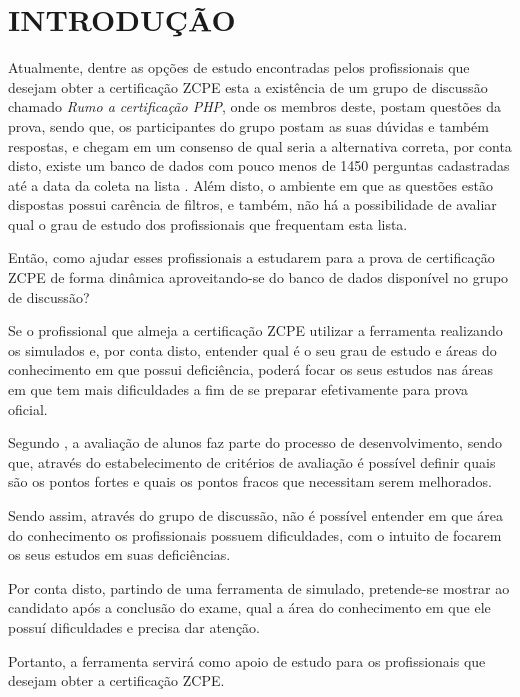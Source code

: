 \chapter{INTRODUÇÃO}
\label{chp:intro}

Atualmente, dentre as opções de estudo encontradas pelos
profissionais que desejam obter a certificação \ac{ZCPE} esta a existência de um
grupo de discussão chamado \textit{Rumo a certificação PHP}, onde os membros
deste, postam questões da prova, sendo que, os participantes do grupo postam as
suas dúvidas e também respostas, e chegam em um consenso de qual seria a
alternativa correta, por conta disto, existe um banco de dados com pouco menos
de 1450 perguntas cadastradas até a data da coleta na lista
\cite{googleGroupsRumoACertificaoPHP}. Além disto, o ambiente em que as
questões estão dispostas possui carência de filtros, e também, não há a
possibilidade de avaliar qual o grau de estudo dos profissionais que frequentam
esta lista.

Então, como ajudar esses profissionais a estudarem para a prova de certificação
\acs{ZCPE} de forma dinâmica aproveitando-se do banco de dados disponível no
grupo de discussão?


Se o profissional que almeja a certificação \acs{ZCPE} utilizar a ferramenta
realizando os simulados e, por conta disto, entender qual é o seu grau de estudo e áreas
do conhecimento em que possui deficiência, poderá focar os seus estudos
nas áreas em que tem mais dificuldades a fim de se preparar efetivamente para
prova oficial.


Segundo , a avaliação de
alunos faz parte do processo de desenvolvimento, sendo que, através do estabelecimento
de critérios de avaliação é possível definir quais são os pontos fortes e quais
os pontos fracos que necessitam serem melhorados.

Sendo assim, através do grupo de discussão, não é possível entender em
que área do conhecimento os profissionais possuem dificuldades, com o intuito de
focarem os seus estudos em suas deficiências.

Por conta disto, partindo de uma ferramenta de simulado, pretende-se mostrar ao
candidato após a conclusão do exame, qual a área do conhecimento em que ele
possuí dificuldades e precisa dar atenção.

Portanto, a ferramenta servirá como apoio de
estudo para os profissionais que desejam obter a certificação \acs{ZCPE}.


